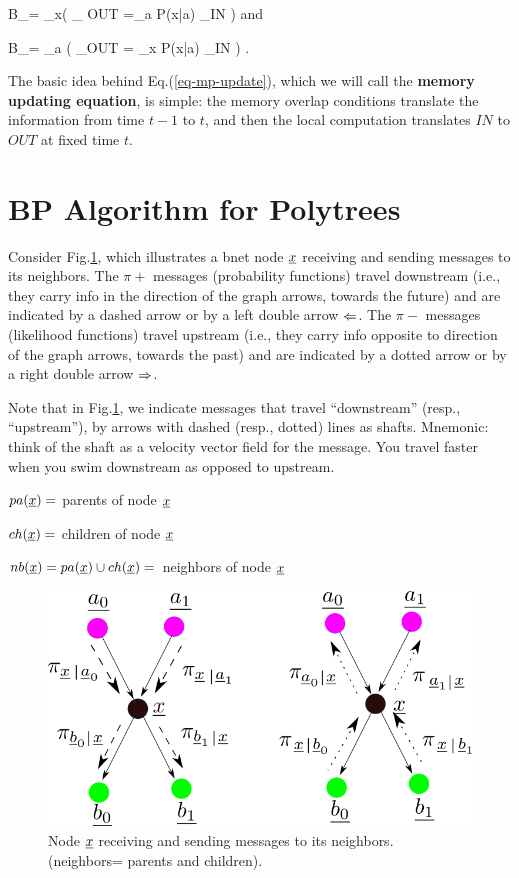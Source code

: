 \beq
B_\pi=
\prod_{x}\indi\left(
_
{OUT}
=\sum_a P(x|a)
_{IN}
\right)
\eeq
and

\beq
B_\pi=
\prod_{a}
\indi\left(
_{OUT}
=
\sum_x P(x|a)
_{IN}
\right)
\;.
\eeq

The basic idea behind Eq.(\ref{eq-mp-update}),
which we will call the
{\bf memory updating equation}, is simple:
the memory overlap conditions translate the information
from time $t-1$ to $t$, and
then the local computation translates
$IN$ to $OUT$ at fixed time $t$.




\section{BP Algorithm for Polytrees}


Consider Fig.\ref{fig-pi-lam},
which illustrates
a bnet node ${\underline{x}}$ receiving and sending
messages to its neighbors.
The $\pi+$  messages
(probability functions)
travel downstream (i.e.,
they carry info
in the direction
of the graph arrows, towards the future)
and are indicated by a dashed arrow
or by a left double arrow $\Leftarrow$.
The $\pi-$  messages
(likelihood functions) travel
upstream (i.e., they
carry info opposite to
direction of the graph arrows,
towards the past)
and are indicated
by a dotted arrow
or by a right double arrow $\Rightarrow$.


Note that in Fig.\ref{fig-pi-lam},
we indicate
messages that travel
\enquote{downstream}
(resp., \enquote{upstream}), by
arrows with dashed (resp., dotted)
 lines as shafts.
Mnemonic: think of the shaft as a
 velocity vector field
for the message.
You travel faster when
you swim downstream as opposed
to upstream.

$pa({\underline{x}})=$ parents of node ${\underline{x}}$

$ch({\underline{x}})=$ children of node ${\underline{x}}$

$nb({\underline{x}})=pa({\underline{x}})\cup ch({\underline{x}})=$
neighbors of node ${\underline{x}}$



\begin{figure}[h!]
\centering
\includegraphics[width=5in]{mpass/pi-lam.png}
\caption{Node ${\underline{x}}$ receiving
and sending messages to
 its neighbors. (neighbors=
parents and children).
}
\label{fig-pi-lam}
\end{figure}


